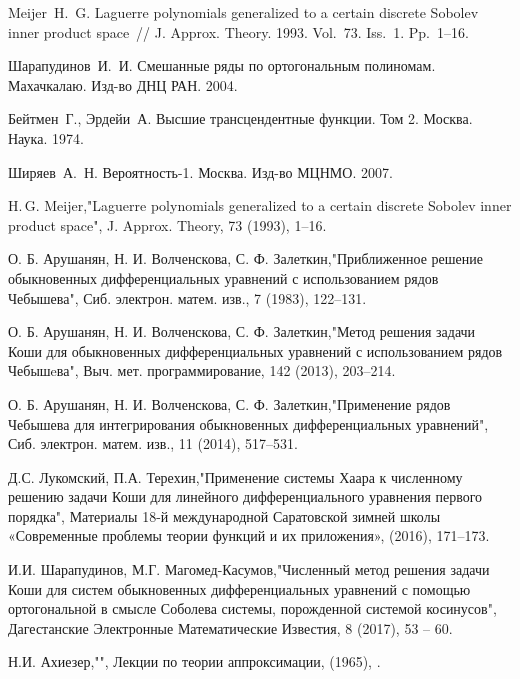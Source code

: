 \begin{thebibliography}{99}
Meijer~H.~G. Laguerre polynomials generalized to a certain discrete Sobolev inner product space~// J. Approx. Theory. 1993. Vol.~73. Iss.~1. Pp.~1--16.


Шарапудинов~И.~И. Смешанные ряды по ортогональным полиномам. Махачкалаю. Изд-во ДНЦ РАН. 2004.


Бейтмен~Г., Эрдейи~А. Высшие трансцендентные функции. Том 2. Москва. Наука. 1974.


Ширяев~А.~Н. Вероятность-1. Москва. Изд-во МЦНМО. 2007.


H.\,G. Meijer,"Laguerre polynomials generalized to a certain discrete Sobolev inner product space", J. Approx. Theory, 73 (1993), 1--16.


О. Б. Арушанян, Н. И. Волченскова, С. Ф. Залеткин,"Приближенное решение обыкновенных дифференциальных уравнений с использованием рядов Чебышева", Сиб. электрон. матем. изв., 7 (1983), 122–131.


О. Б. Арушанян, Н. И. Волченскова, С. Ф. Залеткин,"Метод решения задачи Коши для обыкновенных дифференциальных уравнений с использованием рядов Чебышeва", Выч. мет. программирование, 142 (2013), 203--214.


О. Б. Арушанян, Н. И. Волченскова, С. Ф. Залеткин,"Применение рядов Чебышева для интегрирования обыкновенных дифференциальных уравнений", Сиб. электрон. матем. изв., 11 (2014), 517--531.


Д.С. Лукомский, П.А. Терехин,"Применение системы Хаара к численному решению задачи Коши для линейного дифференциального уравнения первого порядка", Материалы 18-й международной Саратовской зимней школы «Современные проблемы теории функций и их приложения»,  (2016), 171--173.


И.И. Шарапудинов, М.Г. Магомед-Касумов,"Численный метод решения задачи Коши для систем обыкновенных дифференциальных уравнений с помощью ортогональной в смысле Соболева системы, порожденной системой косинусов", Дагестанские Электронные Математические Известия, 8 (2017), 53 -- 60.


Н.И. Ахиезер,"", Лекции по теории аппроксимации,  (1965), .


\end{thebibliography}
